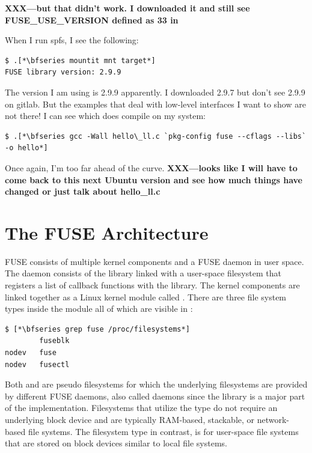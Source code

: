 \textbf{XXX---but that didn't work. I downloaded it and still see FUSE\_USE\_VERSION defined as 33 in }

When I run spfs, I see the following:

\begin{lstlisting}
$ .[*\bfseries mountit mnt target*]
FUSE library version: 2.9.9
\end{lstlisting}

\noindent
The version I am using is 2.9.9 apparently. I downloaded 2.9.7 but don't see 2.9.9 on gitlab. But the examples that deal with low-level interfaces I want to show are not there! I can see  which does compile on my system:

\begin{lstlisting}
$ .[*\bfseries gcc -Wall hello\_ll.c `pkg-config fuse --cflags --libs` -o hello*]
\end{lstlisting}

\noindent
Once again, I'm too far ahead of the curve. \textbf{XXX---looks like I will have to come back to this next Ubuntu version and see how much things have changed or just talk about hello\_ll.c}


\section{The FUSE Architecture}

FUSE consists of multiple kernel components and a FUSE daemon in user space. The daemon consists of the  library linked with a user-space filesystem that registers a list of callback functions with the library. The kernel components are linked together as a Linux kernel module called . There are three file system types inside the  module all of which are visible in :

\begin{lstlisting}
$ [*\bfseries grep fuse /proc/filesystems*]
        fuseblk
nodev	fuse
nodev	fusectl
\end{lstlisting}

\noindent
Both  and  are pseudo filesystems for which the underlying filesystems are provided by different FUSE daemons, also called  daemons since the  library is a major part of the implementation. Filesystems that utilize the  type do not require an underlying block device and are typically RAM-based, stackable, or network-based file systems. The  filesystem type in contrast, is for user-space file systems that are stored on block devices similar to local file systems.

